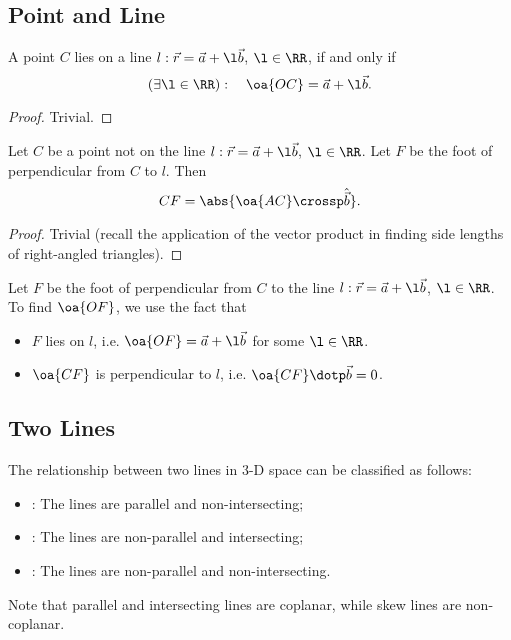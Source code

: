 \subsection{Point and Line}

\begin{proposition}
    A point $C$ lies on a line $l : \vec r = \vec a + \l \vec b$, $\l \in \RR$, if and only if \[(\exists \l \in \RR): \quad \oa{OC} = \vec a + \l \vec b.\]
\end{proposition}
\begin{proof}
    Trivial.
\end{proof}

\begin{proposition}
    Let $C$ be a point not on the line $l : \vec r = \vec a + \l \vec b$, $\l \in \RR$. Let $F$ be the foot of perpendicular from $C$ to $l$. Then \[CF = \abs{\oa{AC} \crossp \hat{\vec b}}.\]
\end{proposition}
\begin{proof}
    Trivial (recall the application of the vector product in finding side lengths of right-angled triangles).
\end{proof}

\begin{recipe}
    Let $F$ be the foot of perpendicular from $C$ to the line $l : \vec r = \vec a + \l \vec b$, $\l \in \RR$. To find $\oa{OF}$, we use the fact that
    \begin{itemize}
        \item $F$ lies on $l$, i.e. $\oa{OF} = \vec a + \l \vec b$ for some $\l \in \RR$.
        \item $\oa{CF}$ is perpendicular to $l$, i.e. $\oa{CF} \dotp \vec b = 0$.
    \end{itemize}
\end{recipe}

\subsection{Two Lines}

\begin{definition}
    The relationship between two lines in 3-D space can be classified as follows:
    \begin{itemize}
        \item {}: The lines are parallel and non-intersecting;
        \item {}: The lines are non-parallel and intersecting;
        \item {}: The lines are non-parallel and non-intersecting.
    \end{itemize}
\end{definition}
\begin{remark}
    Note that parallel and intersecting lines are coplanar, while skew lines are non-coplanar.
\end{remark}

